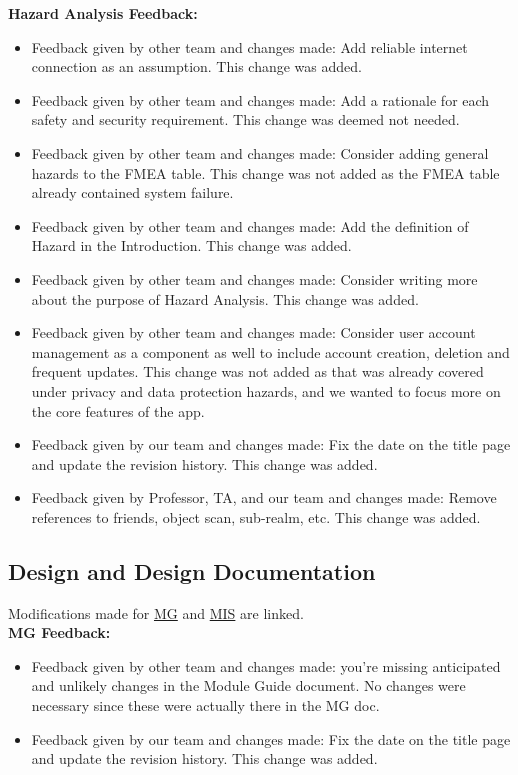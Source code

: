 \documentclass{article}
\begin{document}
\textbf{Hazard Analysis Feedback:}
\begin{itemize}
    \item Feedback given by other team and changes made: Add reliable internet connection as an assumption. This change was added.
    \item Feedback given by other team and changes made: Add a rationale for each safety and security requirement. This change was deemed not needed.
    \item Feedback given by other team and changes made: Consider adding general hazards to the FMEA table. This change was not added as the FMEA table already contained system failure.
    \item Feedback given by other team and changes made: Add the definition of Hazard in the Introduction. This change was added.
    \item Feedback given by other team and changes made: Consider writing more about the purpose of Hazard Analysis. This change was added.
    \item Feedback given by other team and changes made: Consider user account management as a component as well to include account creation, deletion and frequent updates. This change was not added as that was already covered under privacy and data protection hazards, and we wanted to focus more on the core features of the app.
    \item Feedback given by our team and changes made: Fix the date on the title page and update the revision history. This change was added.
    \item Feedback given by Professor, TA, and our team and changes made: Remove references to friends, object scan, sub-realm, etc. This change was added.
\end{itemize}

\subsection{Design and Design Documentation}

Modifications made for \href{https://github.com/russellrd/realm/issues/112}{MG} and \href{https://github.com/russellrd/realm/pull/150}{MIS} are linked.\\

\textbf{MG Feedback:}
\begin{itemize}
    \item Feedback given by other team and changes made: you're missing anticipated and unlikely changes in the Module Guide document. No changes were necessary since these were actually there in the MG doc.
    \item Feedback given by our team and changes made: Fix the date on the title page and update the revision history. This change was added.
\end{itemize}
\end{document}
